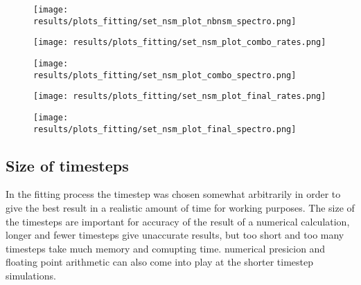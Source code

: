 \begin{figure}
  \begin{minipage}[t][][t]{0.4\textwidth}
    \centering
    \texttt{[image: results/plots\_fitting/set\_nsm\_plot\_nbnsm\_spectro.png]}
    \caption[\todo nbnsm spectro plot ]{
      \label{fig:fit-v3-number-euro}
    }
    \texttt{[image: results/plots\_fitting/set\_nsm\_plot\_combo\_rates.png]}
    \caption[\todo 'combo' rate plot ]{
      \label{fig:fit-v3-combo-nsmr}
    }
  \end{minipage}
  \hfill
  \begin{minipage}[t][][t]{0.4\textwidth}
    \centering
    \texttt{[image: results/plots\_fitting/set\_nsm\_plot\_combo\_spectro.png]}
    \caption[\todo combo'spectro' plot]{
      \label{fig:fit-v3-combo-euro}
    }
    \texttt{[image: results/plots\_fitting/set\_nsm\_plot\_final\_rates.png]}
    \caption[\todo final rate plot]{
      \label{fig:fit-v3-nsmr}
    }
  \end{minipage}
  \centering
  \begin{minipage}[h][][t]{0.5\textwidth}
    \centering
    \texttt{[image: results/plots\_fitting/set\_nsm\_plot\_final\_spectro.png]}
    \caption[\todo final spectro plot]{
      \label{fig:fit-v3-final-euro}
    }
  \end{minipage}
\end{figure}

\begin{table}[h]
  \caption[\omegamodel-parameters from fitting r-process events to \eris]{
    \label{tab:fitting-parameters-nsm}
  }
\end{table}
\FloatBarrier

\subsection{Size of timesteps}
In the fitting process the timestep was chosen somewhat arbitrarily in order to give the best result in a realistic amount of time for working purposes. The size of the timesteps are important for accuracy of the result of a numerical calculation, longer and fewer timesteps give unaccurate results, but too short and too many timesteps take much memory and comupting time. numerical presicion and floating point arithmetic can also come into play at the shorter timestep simulations.

